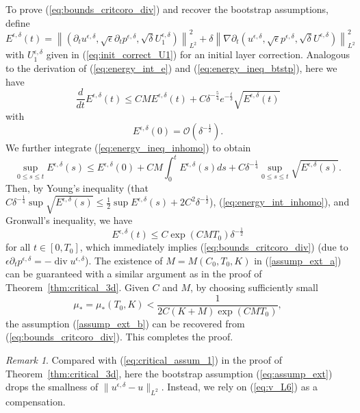 \documentclass[reqno,10pt]{amsart}
\theoremstyle{definition}
\theoremstyle{remark}
\newtheorem{remark}[theorem]{Remark}
\numberwithin{equation}{section}
\DeclareMathOperator{\dive}{div}
\begin{document}
To prove (\ref{eq:bounds_critcoro_div}) and recover the bootstrap assumptions, define
\begin{equation} \label{eq:energy_crit_inhomo}
    E^{\epsilon,\delta}(t) = \left\| \left(\partial_t u^{\epsilon,\delta}, \sqrt\epsilon \partial_t p^{\epsilon,\delta}, \sqrt\delta  U_1^{\epsilon,\delta}\right) \right\|_{L^2}^2 + \delta \left\| \nabla\partial_t \left(u^{\epsilon,\delta}, \sqrt\epsilon p^{\epsilon,\delta}, \sqrt\delta U^{\epsilon,\delta}\right) \right\|_{L^2}^2
\end{equation}
with $U_1^{\epsilon,\delta}$ given in (\ref{eq:init_correct_U1}) for an initial layer correction. Analogous to the derivation of  (\ref{eq:energy_int_e}) and (\ref{eq:energy_ineq_btstp}), here we have 
\begin{equation} \label{eq:energy_ineq_inhomo}
    \frac{d}{dt}E^{\epsilon,\delta}(t) \le CME^{\epsilon,\delta}(t) + C\delta^{-\frac{5}{4}}e^{-\frac{t}{\delta}} \sqrt{E^{\epsilon,\delta}(t)}
\end{equation}
with
\begin{equation} \label{eq:energy_int_inhomo}
    E^{\epsilon,\delta}(0)=\mathcal O(\delta^{-\frac{1}{2}}).
\end{equation}
We further integrate (\ref{eq:energy_ineq_inhomo}) to obtain
\[
   \sup_{0\le s\le t}E^{\epsilon,\delta}(s) \le E^{\epsilon,\delta}(0) + CM \int_0^t E^{\epsilon,\delta}(s) ds + C\delta^{-\frac{1}{4}} \sup_{0\le s\le t} \sqrt{E^{\epsilon,\delta}(s)}.
\]
Then, by Young's inequality (that $C\delta^{-\frac{1}{4}} \sup \sqrt{E^{\epsilon,\delta}(s)}\le \frac{1}{2} \sup E^{\epsilon,\delta}(s) + 2C^2\delta^{-\frac{1}{2}}$), (\ref{eq:energy_int_inhomo}), and Gronwall's inequality, we have
\begin{equation} \label{eq:energy_bound_inhomo}
    E^{\epsilon,\delta}(t) \le C\exp(CMT_0)\delta^{-\frac{1}{2}}
\end{equation}
for all $t\in [0,T_0]$, which immediately implies (\ref{eq:bounds_critcoro_div}) (due to $\epsilon \partial_t p^{\epsilon,\delta}=-\dive u^{\epsilon,\delta}$). The existence of $M=M(C_0, T_0,K)$ in (\ref{assump_ext_a}) can be guaranteed with a similar argument as in the proof of Theorem~\ref{thm:critical_3d}. Given $C$ and $M$, by choosing sufficiently small
\[
    \mu_*=\mu_*(T_0,K) <\frac{1}{2C(K+M)\exp(CMT_0)},
\]
the assumption (\ref{assump_ext_b}) can be recovered from (\ref{eq:bounds_critcoro_div}). This completes the proof.

\begin{remark}
    Compared with (\ref{eq:critical_assum_1}) in the proof of Theorem~\ref{thm:critical_3d}, here the bootstrap assumption (\ref{eq:assump_ext}) drops the smallness of $\| u^{\epsilon,\delta} - u\|_{L^2}$. Instead, we rely on (\ref{eq:v_L6}) as a compensation.
\end{remark}
\end{document}

